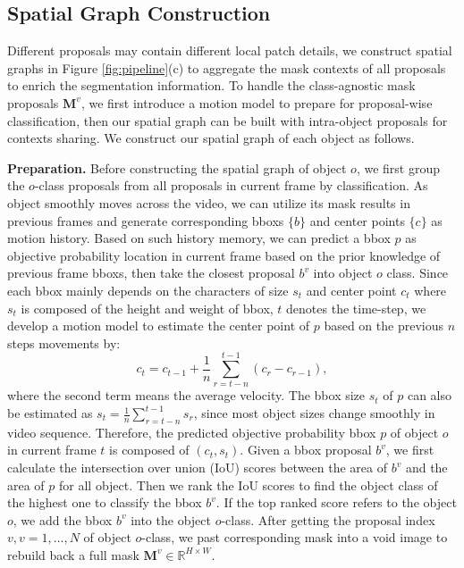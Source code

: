 \documentclass[letterpaper]{article} \usepackage{aaai21}  \usepackage{times}  \usepackage{helvet} \usepackage{courier}  \usepackage[hyphens]{url}  \usepackage{graphicx} \urlstyle{rm} \def\UrlFont{\rm}  \usepackage{graphicx}  \usepackage{natbib}  \usepackage{caption} \frenchspacing  \setlength{\pdfpagewidth}{8.5in}  \setlength{\pdfpageheight}{11in}  \usepackage{amsmath}
\begin{document}
\subsection{Spatial Graph Construction}
Different proposals may contain different local patch details, we construct spatial graphs in Figure \ref{fig:pipeline}(c) to aggregate the mask contexts of all proposals to enrich the segmentation information. To handle the class-agnostic mask proposals $\bm{M}^v$, we first introduce a motion model to prepare for proposal-wise classification, then our spatial graph can be built with intra-object proposals for contexts sharing. We construct our spatial graph of each object as follows.

\noindent \textbf{Preparation.}
Before constructing the spatial graph of object $o$, we first group the $o$-class proposals from all proposals in current frame by classification.
As object smoothly moves across the video, we can utilize its mask results in previous frames and generate corresponding bboxs $\{b\}$ and center points $\{c\}$ as motion history. Based on such history memory, we can predict a bbox $p$ as objective probability location in current frame based on the prior knowledge of previous frame bboxs, then take the closest proposal $b^v$ into object $o$ class.
Since each bbox mainly depends on the characters of size $s_{t}$ and center point $c_{t}$ where $s_{t}$ is composed of the height and weight of bbox, $t$ denotes the time-step, we develop a motion model to estimate the center point of $p$ based on the previous $n$ steps movements by:
\begin{equation}
    c_{t} = c_{t-1} + \frac{1}{n}\sum_{r=t-n}^{t-1}(c_{r}-c_{r-1}),
\end{equation}
where the second term means the average velocity. The bbox size $s_{t}$ of $p$ can also be estimated as $s_{t}=\frac{1}{n}\sum_{r=t-n}^{t-1}s_r$, since most object sizes change smoothly in video sequence. Therefore, the predicted objective probability bbox $p$ of object $o$ in current frame $t$ is composed of $(c_{t},s_{t})$.
Given a bbox proposal $b^v$, we first calculate the intersection over union (IoU) scores between the area of $b^v$ and the area of $p$ for all object. Then we rank the IoU scores to find the object class of the highest one to classify the bbox $b^v$.
If the top ranked score refers to the object $o$, we add the bbox $b^v$ into the object $o$-class.
After getting the proposal index $v,v=1,...,N$ of object $o$-class, we past corresponding mask into a void image to rebuild back a full mask $\bm{M}^v \in \mathbb{R}^{H\times W}$. 
\end{document}
